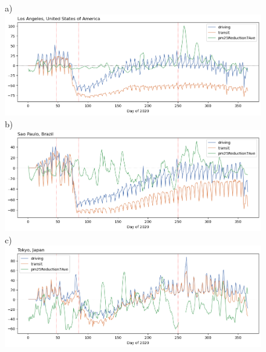 \documentclass[preprint,12pt]{elsarticle}
\begin{document}
\begin{figure}
     \centering
       \scriptsize a)~\includegraphics[width=\textwidth,trim={0 37 0 0},clip]{Images/LA_Drive_trans_pm25.png}
         \label{fig:LosAngeles}
         b)~\includegraphics[width=\textwidth,trim={0 37 0 0},clip]{Images/SaoPaulo_Drive_trans_pm25.png}
         \label{fig:SaoPaulo}
         c)~\includegraphics[width=\textwidth]{Images/Tokyo_Drive_trans_pm25.png}

\end{figure}
\end{document}
